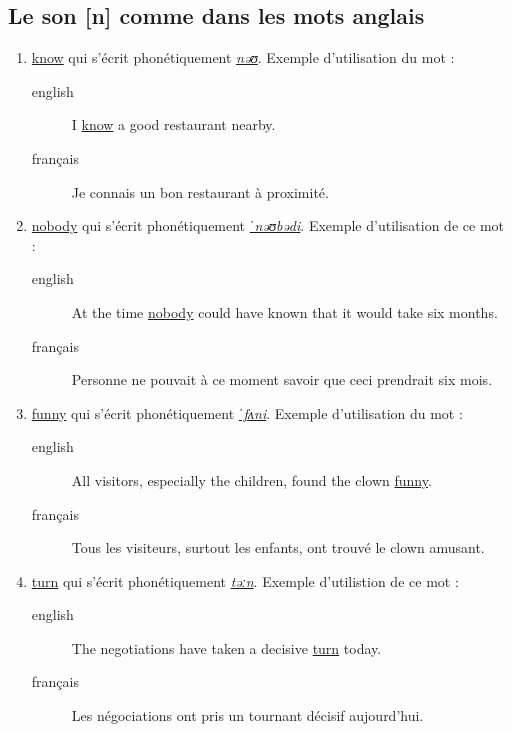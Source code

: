 \subsection{Le son [n] comme dans les mots anglais}
\label{sec:org1fe12d0}
\begin{enumerate}
\item \href{http://www.wordreference.com/enfr/know}{know} qui s'écrit phonétiquement \href{https://en.oxforddictionaries.com/definition/know}{\emph{nəʊ}}. Exemple d'utilisation du
mot : 
\begin{description}
\item[{english}] \textenglish{I \href{https://youtu.be/j-CwwdwQV54}{know} a good restaurant nearby.}
\item[{français}] Je connais un bon restaurant à proximité.
\end{description}
\item \href{http://www.wordreference.com/enfr/nobody}{nobody} qui s'écrit phonétiquement \href{https://en.oxforddictionaries.com/definition/nobody}{\emph{ˈnəʊbədi}}. Exemple d'utilisation
de ce mot :
\begin{description}
\item[{english}] \textenglish{At the time \href{https://youtu.be/icE0AqVSnzo}{nobody} could have known that it would take
six months.}
\item[{français}] Personne ne pouvait à ce moment savoir que ceci prendrait six mois.
\end{description}
\item \href{http://www.wordreference.com/enfr/funny}{funny} qui s'écrit phonétiquement \href{https://en.oxforddictionaries.com/definition/funny}{\emph{ˈfʌni}}. Exemple d'utilisation du
mot : 
\begin{description}
\item[{english}] \textenglish{All visitors, especially the children, found the clown
\href{https://youtu.be/CNXOu7gPEXM}{funny}.}
\item[{français}] Tous les visiteurs, surtout les enfants, ont trouvé
le clown amusant.
\end{description}
\item \href{http://www.wordreference.com/enfr/turn}{turn} qui s'écrit phonétiquement \href{https://en.oxforddictionaries.com/definition/turn}{\emph{təːn}}. Exemple d'utilistion de ce
mot : 
\begin{description}
\item[{english}] \textenglish{The negotiations have taken a decisive \href{https://youtu.be/z4g45vTgczE}{turn} today.}
\item[{français}] Les négociations ont pris un tournant décisif
aujourd'hui.
\end{description}
\end{enumerate}
